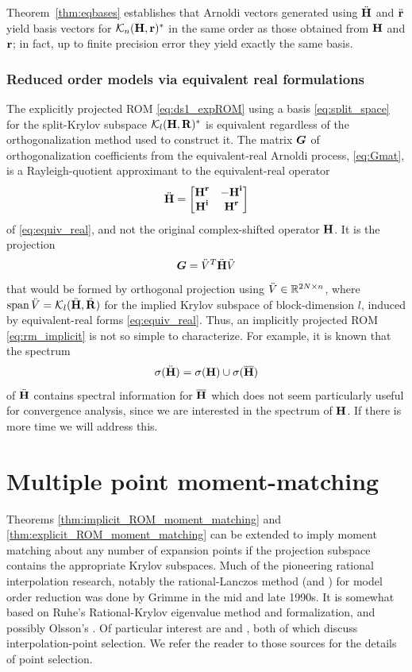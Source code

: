 Theorem~\ref{thm:eqbases} establishes that Arnoldi vectors generated using ${\ddot{\textbf{\textup{H}}}}$ and $\ddot{\textbf{\textup{r}}}$
yield basis vectors for $\mathcal{K}_{n}({\textbf{\textup{H}}},{\textbf{\textup{r}}})^*$ in the same order as those obtained from $\textbf{\textup{H}}$ and $\textbf{\textup{r}}$;
in fact, up to finite precision error they yield exactly the same basis.

\subsubsection{Reduced order models via equivalent real formulations}
The explicitly projected ROM \eqref{eq:ds1_expROM} using a basis \eqref{eq:split_space} for the split-Krylov subspace $\mathcal{K}_{l}({\textbf{\textup{H}}},{\textbf{\textup{R}}})^*$  is equivalent regardless of the orthogonalization method used to construct it.   The matrix $\boldsymbol{G}$ of orthogonalization coefficients from the equivalent-real Arnoldi process, \eqref{eq:Gmat}, is a Rayleigh-quotient approximant to the equivalent-real operator
\[
{\ddot{\textbf{\textup{H}}}} = \begin{bmatrix} \textbf{\textup{H}}^{\mathrm{\bf{r}}}_{} & -\textbf{\textup{H}}^{\mathrm{\bf{i}}}_{}\\ \textbf{\textup{H}}^{\mathrm{\bf{i}}}_{} & \textbf{\textup{H}}^{\mathrm{\bf{r}}}_{} \end{bmatrix} 
\]
 of \eqref{eq:equiv_real}, and not the original complex-shifted operator $\textbf{\textup{H}}$.   It is the projection 
\[
\boldsymbol{G} = \ddot{V}^T {\ddot{\textbf{\textup{H}}}} \ddot{V}
\]
that would be formed by orthogonal projection using $\ddot{V}\in\mathbb{R}^{2N \times n}$, where $\operatorname*{span} \ddot{V} = \mathcal{K}_{l}({{\ddot{\textbf{\textup{H}}}}},{{\ddot{\textbf{\textup{R}}}}})$ for the implied Krylov subspace of block-dimension $l$, induced by equivalent-real forms \eqref{eq:equiv_real}.  Thus, an implicitly projected ROM \eqref{eq:rm_implicit} is not so simple to characterize.  For example, it is known that the spectrum 
\[
\sigma({\ddot{\textbf{\textup{H}}}}) = \sigma(\textbf{\textup{H}}) \cup \sigma(\overline{\textbf{\textup{H}}})
\]
of ${\ddot{\textbf{\textup{H}}}}$ contains spectral information for $\overline{\textbf{\textup{H}}}$ which does not seem particularly useful for convergence analysis, since we are interested in the spectrum of $\textbf{\textup{H}}$.  If there is more time we will address this.  

\clearpage
\section{Multiple point moment-matching}
Theorems \ref{thm:implicit_ROM_moment_matching} and  \ref{thm:explicit_ROM_moment_matching} can be extended to imply moment matching about any number of expansion points  if the projection subspace contains the appropriate Krylov subspaces.   Much of the pioneering rational interpolation research, notably the rational-Lanczos method \cite{gallivan1996rational} (and \cite{grimme1997krylovratinterp}) for model order reduction was done by Grimme in the mid and late 1990s.  It is somewhat based on Ruhe's Rational-Krylov \cite{ruhe1984, ruhe1994rational} eigenvalue method and formalization, and possibly Olsson's \cite{olsson2006rational}.   Of particular interest are  \cite{grimme1998rational} and \cite{druskin2011adaptive}, both of which discuss interpolation-point selection.  We refer the reader to those sources for the details of point selection.

